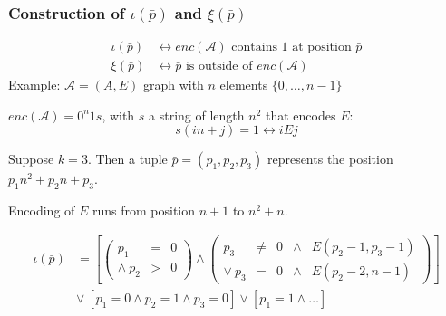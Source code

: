 \documentclass{beamer}
\newcommand{\A}{\mathcal{A}}
\begin{document}
\begin{frame}
	\frametitle{Construction of $ι(\bar{p})$ and $ξ(\bar{p})$}
	\begin{align*}
	ι(\bar{p}) &\leftrightarrow enc(\A) \text{ contains $1$ at position } \bar{p}\\
	ξ(\bar{p}) &\leftrightarrow \bar{p} \text{ is outside of } enc(\A)
	\end{align*}	
	Example: $\A = (A, E)$ graph with $n$ elements $\{0,…,n-1\}$
	
	$enc(\A) = 0^n1s$, with $s$ a string of length $n^2$ that encodes $E$:
	\begin{equation*}
	s(in+j) = 1 \leftrightarrow i E j
	\end{equation*}
	
	Suppose $k = 3$. Then a tuple $\bar{p} = (p_1,p_2,p_3)$ represents the position $p_1 n^2 + p_2 n + p_3$.
	
	Encoding of $E$ runs from position $n+1$ to $n^2 + n$.
	

	\begin{align*}
	ι(\bar{p}) &= \left[\left(\begin{array}{rcl}
	p_1 &=& 0 \\
	∧\ p_2 &>& 0
	\end{array}\right) ∧ \left(\begin{array}{rclcl}
	p_3 &\neq& 0 &∧& E(p_2-1, p_3-1)\\
	∨\ p_3 &=& 0 &∧& E(p_2-2, n-1)
	\end{array}\right)\right]\\
	&∨\ \left[p_1 = 0 ∧ p_2 = 1 ∧ p_3 = 0\right] ∨ \left[p_1 = 1 ∧ … \right]
	\end{align*}
\end{frame}
\end{document}
